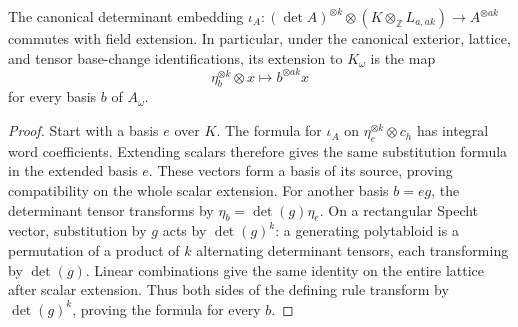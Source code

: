 \begin{lemma}
\label{lem:contraction-determinant-base-change}
\leanok
The canonical determinant embedding
$\iota_A:(\det A)^{\otimes k}\otimes(K\otimes_{\mathbb Z}L_{a,ak})
\to A^{\otimes ak}$ commutes with field extension. In particular, under
the canonical exterior, lattice, and tensor base-change identifications,
its extension to $K_\omega$ is the map
\[
 \eta_b^{\otimes k}\otimes x\longmapsto b^{\otimes ak}x
\]
for every basis $b$ of $A_\omega$.
\end{lemma}
\begin{proof}
Start with a basis $e$ over $K$. The formula for $\iota_A$ on
$\eta_e^{\otimes k}\otimes c_h$ has integral word coefficients.
Extending scalars therefore gives the same substitution formula in the
extended basis $e$. These vectors form a basis of its source, proving
compatibility on the whole scalar extension.
For another basis $b=eg$, the determinant tensor transforms by
$\eta_b=\det(g)\eta_e$. On a rectangular Specht vector, substitution by
$g$ acts by $\det(g)^k$: a generating polytabloid is a permutation of a
product of $k$ alternating determinant tensors, each transforming by
$\det(g)$. Linear combinations give the same identity on the entire
lattice after scalar extension. Thus both sides of the defining rule
transform by $\det(g)^k$, proving the formula for every $b$.
\end{proof}

